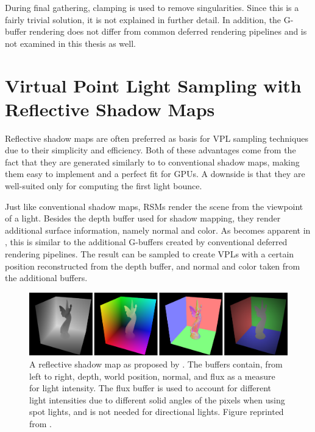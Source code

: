 During final gathering, clamping is used to remove singularities. Since this is a fairly trivial solution, it is not explained in further detail.
In addition, the G-buffer rendering does not differ from common deferred rendering pipelines \citep{Saito:1990:ComprehensibleRendering} and is not examined in this thesis as well.


\section{Virtual Point Light Sampling with Reflective Shadow Maps}
\label{sec:concept:rsmVplSampling}


Reflective shadow maps are often preferred as basis for VPL sampling techniques due to their simplicity and efficiency. Both of these advantages come from the fact that they are generated similarly to to conventional shadow maps, making them easy to implement and a perfect fit for GPUs. A downside is that they are well-suited only for computing the first light bounce.

Just like conventional shadow maps, RSMs render the scene from the viewpoint of a light. Besides the depth buffer used for shadow mapping, they render additional surface information, namely normal and color. As becomes apparent in , this is similar to the additional G-buffers created by conventional deferred rendering pipelines. The result can be sampled to create VPLs with a certain position reconstructed from the depth buffer, and normal and color taken from the additional buffers.

\begin{figure}[htb]
\centering
    \includegraphics[width=\textwidth]{graphics/rsm_dachsbacher}
  \caption{A reflective shadow map as proposed by \citet{Dachsbacher:2005:RSM}. The buffers contain, from left to right, depth, world position, normal, and flux as a measure for light intensity. The flux buffer is used to account for different light intensities due to different solid angles of the pixels when using spot lights, and is not needed for directional lights. Figure reprinted from \citet{Dachsbacher:2005:RSM}.}
  \label{fig:concept:rsm_dachsbacher}
\end{figure}


